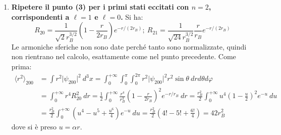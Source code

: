 \documentclass[11pt, a4paper]{scrartcl} %
\numberwithin{equation}{subsection}
\theoremstyle{style2}
\theoremstyle{style1}
\begin{document}
\begin{enumerate}[(1).]
Per il raggio quadratico medio
\[
r_p = \sqrt{\left\langle \lvert \mathbf{x} _1 - \mathbf{x} _2 \rvert ^2 \right\rangle} 
\] 
con $\lvert \mathbf{x} _1 - \mathbf{x} _2 \rvert \equiv r$, si ha:
\[
\begin{split}
	\langle r^2 \rangle &= \braket{100|r^2|100} = \int d^3 x \ \psi _{100} ^*(\mathbf{x} ) r^2 \psi _{100} (\mathbf{x} ) = \int_{0} ^{+\infty} dr \ r^4 \int_{0} ^\pi d\theta \ \sin \theta \int_{0} ^{2\pi} d\varphi \ \lvert Y_{00}  \rvert ^2 \lvert R_{10}  \rvert ^2\\
			    &\int_{0} ^{+\infty} dr \ r^4 \cancel{\int_{-1}^{+1}d(\cos \theta ) \int_{0} ^{2\pi} d\varphi  \ \lvert Y_{00}  \rvert ^2 } \frac{4}{r_B^3}e^{-2 r / r_B} = \frac{4}{r_B^3} \int_{0} ^{+\infty} r^4 e^{- 2r / r_B} \ dr
\end{split}
\] 
dove si \`e usato che $Y_{\ell m}(\theta ,\varphi ) $ \`e correttamente normalizzata. L'integrale rimanente si pu\`o risolvere per parti, oppure notando che per $\alpha  = r / r_B$ si ha $\frac{d ^4}{d \alpha ^4} e^{- \alpha  r} = r^4 e^{-\alpha  r} $, quindi:
\begin{equation}
	\langle r^2 \rangle= 3r_B^2\Rightarrow r_p = \sqrt{3} r_B
\end{equation}
\item \textbf{Ripetere il punto (3) per i primi stati eccitati con $n=2$, corrispondenti a $\ell =1$ e $\ell =0$.} 
Si ha:
\begin{equation*}
	R_{20} = \frac{1}{\sqrt{2} r_B^{3/2} }\left(1 - \frac{r}{2r_B}\right) e^{ - r / (2r_B)}  ; \ R_{21} = \frac{1}{\sqrt{24} r_B^{3 / 2} } \frac{r}{r_B} e^{-r / (2r_B)} 
\end{equation*}
Le armoniche sferiche non sono date perch\'e tanto sono normalizzate, quindi non rientrano nel calcolo, esattamente come nel punto precedente.
Come prima:
\[
\begin{split}
\langle r^2 \rangle_{200} &= \int r^2 \lvert \psi _{200}  \rvert ^2 \ d^3 x = \int_{0} ^{+\infty} \int_{0} ^\pi \int_{0} ^{2\pi} r^2 \lvert \psi _{200}  \rvert ^2 r^2 \sin \theta  \ dr d\theta  d\varphi \\
			  &=\int_{0} ^{+\infty} r^4 R_{20} ^2 \ dr = \frac{1}{2} \int_{0} ^{+\infty} \frac{r^4}{r_B^3} \left(1- \frac{r}{2r_B}\right)^2 e ^{- r / r_B}  \ dr = \frac{r_B^2}{2}\int_{0} ^{+\infty} u^4 \left(1 - \frac{u}{2}\right) ^2 e^{-u}  \ du\\
			  &=\frac{r_{B} ^2}{2}\int_{0} ^{+\infty} \left(u^4 - u^5 + \frac{u^6}{4}\right) e ^{- u}  \ du = \frac{r_B^2}{2} \left(4! - 5! + \frac{6!}{4}\right) = 42 r_B^2
\end{split}
\] 
dove si \`e preso $u = \alpha  r$. 


\end{enumerate}
\end{document}
